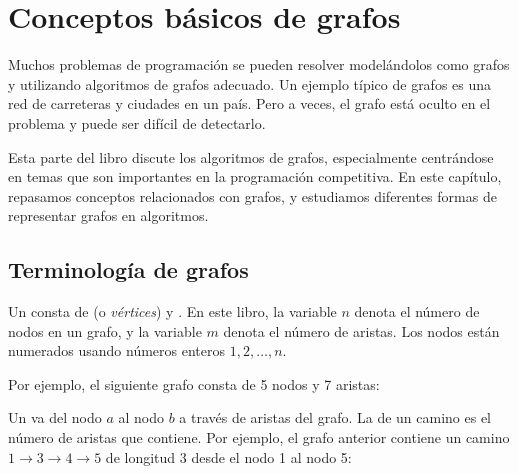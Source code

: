 \chapter{Conceptos básicos de grafos}

Muchos problemas de programación se pueden resolver
modelándolos como grafos y utilizando algoritmos
de grafos adecuado. Un ejemplo típico de grafos es una red
de carreteras y ciudades en un país.
Pero a veces, el grafo está oculto
en el problema y puede ser difícil de detectarlo.

Esta parte del libro discute los algoritmos de grafos,
especialmente centrándose en temas que
son importantes en la programación competitiva.
En este capítulo, repasamos conceptos
relacionados con grafos,
y estudiamos diferentes formas de representar grafos en algoritmos.

\section{Terminología de grafos}


Un  consta de  (o \textit{vértices})
y . En este libro,
la variable $n$ denota el número de nodos
en un grafo, y la variable $m$ denota
el número de aristas.
Los nodos están numerados
usando números enteros $1,2,\ldots,n$.

Por ejemplo, el siguiente grafo consta de 5 nodos y 7 aristas:

\begin{center}
\end{center}


Un  va del nodo $a$ al nodo $b$
a través de aristas del grafo.
La  de un camino es el número de
aristas que contiene.
Por ejemplo, el grafo anterior contiene
un camino $1 \rightarrow 3 \rightarrow 4 \rightarrow 5$
de longitud 3
desde el nodo 1 al nodo 5:

